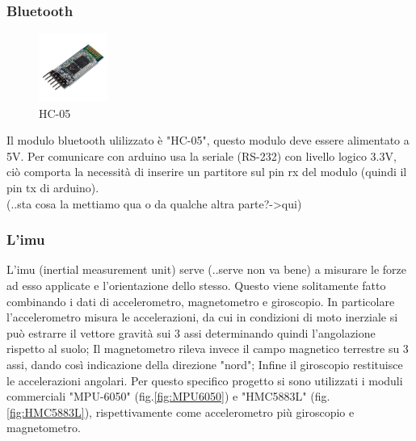 \documentclass[10pt,a4paper]{article}
\begin{document}
\vspace{10pt}

\subsubsection{Bluetooth}
\begin{figure}
	\centering
	\vspace{-30pt}
	\includegraphics[width=0.2\textwidth]{HC-05.jpg}
	\vspace{-30pt}
	\caption{HC-05}
	\label{fig:HC-05}
	\vspace{-30pt}
\end{figure}
Il modulo bluetooth ulilizzato \`e "HC-05", questo modulo deve essere alimentato a 5V. Per comunicare con arduino usa la seriale (RS-232) con livello logico 3.3V, ci\`o comporta la necessit\`a di inserire un partitore sul pin rx del modulo (quindi il pin tx di arduino).
\\
(..sta cosa la mettiamo qua o da qualche altra parte?->qui)

\hfill \break
\hfill \break
\hfill \break


\subsubsection{L'imu}

L'imu (inertial measurement unit) serve (..serve non va bene) a misurare le forze ad esso applicate e l'orientazione dello stesso. Questo viene solitamente fatto combinando i dati di accelerometro, magnetometro e giroscopio. In particolare l'accelerometro misura le accelerazioni, da cui in condizioni di moto inerziale si pu\`o estrarre il vettore gravit\`a sui 3 assi determinando quindi l'angolazione rispetto al suolo; Il magnetometro rileva invece il campo magnetico terrestre su 3 assi, dando cos\`i indicazione della direzione "nord"; Infine il giroscopio restituisce le accelerazioni angolari.
Per questo specifico progetto si sono utilizzati i moduli commerciali "MPU-6050" (fig.\ref{fig:MPU6050}) e "HMC5883L" (fig.\ref{fig:HMC5883L}), rispettivamente come accelerometro pi\`u giroscopio e magnetometro. 
\end{document}
